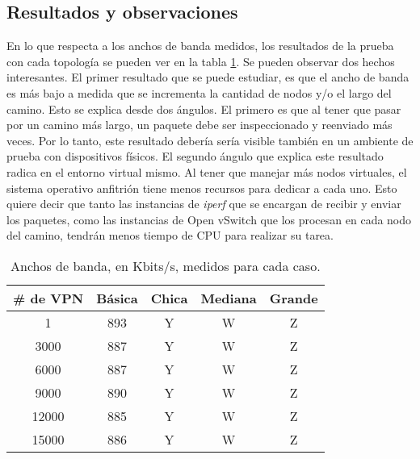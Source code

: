 \subsection{Resultados y observaciones}

En lo que respecta a los anchos de banda medidos, los resultados de la prueba con cada topología se pueden ver en la tabla \ref{table:escala_de_servicios}. Se pueden observar dos hechos interesantes. El primer resultado que se puede estudiar, es que el ancho de banda es más bajo a medida que se incrementa la cantidad de nodos y/o el largo del camino. Esto se explica desde dos ángulos. El primero es que al tener que pasar por un camino más largo, un paquete debe ser inspeccionado y reenviado más veces. Por lo tanto, este resultado debería sería visible también en un ambiente de prueba con dispositivos físicos. El segundo ángulo que explica este resultado radica en el entorno virtual mismo. Al tener que manejar más nodos virtuales, el sistema operativo anfitrión tiene menos recursos para dedicar a cada uno. Esto quiere decir que tanto las instancias de \textit{iperf} que se encargan de recibir y enviar los paquetes, como las instancias de Open vSwitch que los procesan en cada nodo del camino, tendrán menos tiempo de CPU para realizar su tarea. \\

\begin{table}[ht]
	\caption{Anchos de banda, en Kbits/s, medidos para cada caso.}
	\centering 
	\begin{tabular}{c c c c c}
		\hline\hline
		\# de VPN & Básica & Chica & Mediana  & Grande \\ [0.5ex]
		\hline
		1 & 893 & Y & W & Z \\
		3000 & 887 & Y & W & Z  \\
		6000 & 887 & Y & W & Z \\
		9000 & 890 & Y & W & Z \\
		12000 & 885 & Y & W & Z \\
		15000 & 886 & Y & W & Z \\ [1ex]
		\hline
	\end{tabular}
	\label{table:escala_de_servicios}
\end{table}

